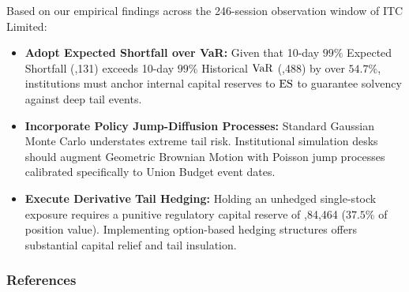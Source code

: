 Based on our empirical findings across the 246-session observation window of ITC Limited:
\begin{itemize}[leftmargin=1.5em, itemsep=1pt, parsep=0pt]
    \item \textbf{Adopt Expected Shortfall over VaR:} Given that 10-day $99\%$ Expected Shortfall (,131) exceeds 10-day $99\%$ Historical $\operatorname{VaR}$ (,488) by over $54.7\%$, institutions must anchor internal capital reserves to $\operatorname{ES}$ to guarantee solvency against deep tail events.
    \item \textbf{Incorporate Policy Jump-Diffusion Processes:} Standard Gaussian Monte Carlo understates extreme tail risk. Institutional simulation desks should augment Geometric Brownian Motion with Poisson jump processes calibrated specifically to Union Budget event dates.
    \item \textbf{Execute Derivative Tail Hedging:} Holding an unhedged single-stock exposure requires a punitive regulatory capital reserve of ,84,464 ($37.5\%$ of position value). Implementing option-based hedging structures offers substantial capital relief and tail insulation.
\end{itemize}

\vspace{-0.4em}

\begingroup
\footnotesize
\setlength{\bibsep}{1.2pt}
\renewcommand{\section}[2]{}%
\subsubsection*{References}


\endgroup
